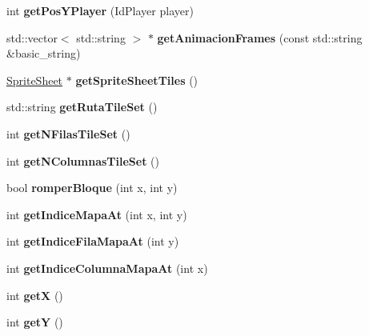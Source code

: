 \begin{DoxyCompactItemize}
\item 
int {\bfseries get\+Pos\+Y\+Player} (Id\+Player player)\hypertarget{class_nivel_mapa_a1e6a410c29cdcbb6fc867453e08b1bd5}{}\label{class_nivel_mapa_a1e6a410c29cdcbb6fc867453e08b1bd5}

\item 
std\+::vector$<$ std\+::string $>$ $\ast$ {\bfseries get\+Animacion\+Frames} (const std\+::string \&basic\+\_\+string)\hypertarget{class_nivel_mapa_a5949b4887427c10991575b87975cccb3}{}\label{class_nivel_mapa_a5949b4887427c10991575b87975cccb3}

\item 
\hyperlink{class_sprite_sheet}{Sprite\+Sheet} $\ast$ {\bfseries get\+Sprite\+Sheet\+Tiles} ()\hypertarget{class_nivel_mapa_aa160e272d2fcaeee2d9601ccfd44cd4a}{}\label{class_nivel_mapa_aa160e272d2fcaeee2d9601ccfd44cd4a}

\item 
std\+::string {\bfseries get\+Ruta\+Tile\+Set} ()\hypertarget{class_nivel_mapa_a491428dc0cd4684ceab50c1ab80d71da}{}\label{class_nivel_mapa_a491428dc0cd4684ceab50c1ab80d71da}

\item 
int {\bfseries get\+N\+Filas\+Tile\+Set} ()\hypertarget{class_nivel_mapa_ad148759e4adb206067b8e6f06bf9d58b}{}\label{class_nivel_mapa_ad148759e4adb206067b8e6f06bf9d58b}

\item 
int {\bfseries get\+N\+Columnas\+Tile\+Set} ()\hypertarget{class_nivel_mapa_a3137fa05ea5bf8956166fc524ce92cb6}{}\label{class_nivel_mapa_a3137fa05ea5bf8956166fc524ce92cb6}

\item 
bool {\bfseries romper\+Bloque} (int x, int y)\hypertarget{class_nivel_mapa_a95a941ee7677da7d7997c2ad0bea53aa}{}\label{class_nivel_mapa_a95a941ee7677da7d7997c2ad0bea53aa}

\item 
int {\bfseries get\+Indice\+Mapa\+At} (int x, int y)\hypertarget{class_nivel_mapa_ae95b7b0f8d4c7521b13a63b001213740}{}\label{class_nivel_mapa_ae95b7b0f8d4c7521b13a63b001213740}

\item 
int {\bfseries get\+Indice\+Fila\+Mapa\+At} (int y)\hypertarget{class_nivel_mapa_afe955ab11816234cf050ab576a1ac0b6}{}\label{class_nivel_mapa_afe955ab11816234cf050ab576a1ac0b6}

\item 
int {\bfseries get\+Indice\+Columna\+Mapa\+At} (int x)\hypertarget{class_nivel_mapa_a080b8df56d1f9598c60ada0b215ccd97}{}\label{class_nivel_mapa_a080b8df56d1f9598c60ada0b215ccd97}

\item 
int {\bfseries getX} ()\hypertarget{class_nivel_mapa_a4ed1e642123d0955148d8fd0a880e4f4}{}\label{class_nivel_mapa_a4ed1e642123d0955148d8fd0a880e4f4}

\item 
int {\bfseries getY} ()\hypertarget{class_nivel_mapa_abdb6fc04d0833e90085d865503f8fd18}{}\label{class_nivel_mapa_abdb6fc04d0833e90085d865503f8fd18}

\end{DoxyCompactItemize}
